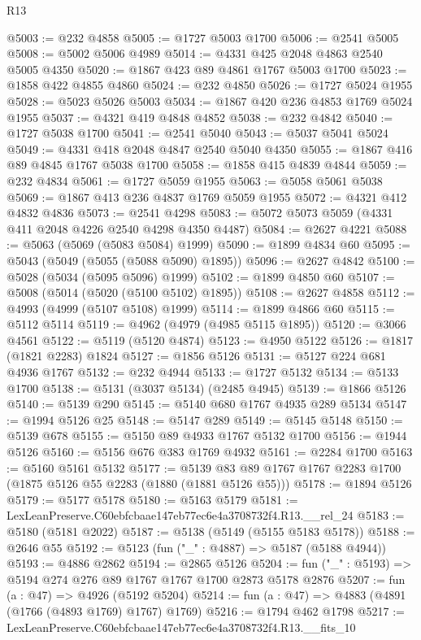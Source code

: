 \begin{lexlean}{R13}
\begin{coremodule}
@5003 := @232 @4858
@5005 := @1727 @5003 @1700
@5006 := @2541 @5005
@5008 := @5002 @5006 @4989
@5014 := @4331 @425 @2048 @4863 @2540 @5005 @4350
@5020 := @1867 @423 @89 @4861 @1767 @5003 @1700
@5023 := @1858 @422 @4855 @4860
@5024 := @232 @4850
@5026 := @1727 @5024 @1955
@5028 := @5023 @5026 @5003
@5034 := @1867 @420 @236 @4853 @1769 @5024 @1955
@5037 := @4321 @419 @4848 @4852
@5038 := @232 @4842
@5040 := @1727 @5038 @1700
@5041 := @2541 @5040
@5043 := @5037 @5041 @5024
@5049 := @4331 @418 @2048 @4847 @2540 @5040 @4350
@5055 := @1867 @416 @89 @4845 @1767 @5038 @1700
@5058 := @1858 @415 @4839 @4844
@5059 := @232 @4834
@5061 := @1727 @5059 @1955
@5063 := @5058 @5061 @5038
@5069 := @1867 @413 @236 @4837 @1769 @5059 @1955
@5072 := @4321 @412 @4832 @4836
@5073 := @2541 @4298
@5083 := @5072 @5073 @5059 (@4331 @411 @2048 @4226 @2540 @4298 @4350 @4487)
@5084 := @2627 @4221
@5088 := @5063 (@5069 (@5083 @5084) @1999)
@5090 := @1899 @4834 @60
@5095 := @5043 (@5049 (@5055 (@5088 @5090) @1895))
@5096 := @2627 @4842
@5100 := @5028 (@5034 (@5095 @5096) @1999)
@5102 := @1899 @4850 @60
@5107 := @5008 (@5014 (@5020 (@5100 @5102) @1895))
@5108 := @2627 @4858
@5112 := @4993 (@4999 (@5107 @5108) @1999)
@5114 := @1899 @4866 @60
@5115 := @5112 @5114
@5119 := @4962 (@4979 (@4985 @5115 @1895))
@5120 := @3066 @4561
@5122 := @5119 (@5120 @4874)
@5123 := @4950 @5122
@5126 := @1817 (@1821 @2283) @1824
@5127 := @1856 @5126
@5131 := @5127 @224 @681 @4936 @1767
@5132 := @232 @4944
@5133 := @1727 @5132
@5134 := @5133 @1700
@5138 := @5131 (@3037 @5134) (@2485 @4945)
@5139 := @1866 @5126
@5140 := @5139 @290
@5145 := @5140 @680 @1767 @4935 @289 @5134
@5147 := @1994 @5126 @25
@5148 := @5147 @289
@5149 := @5145 @5148
@5150 := @5139 @678
@5155 := @5150 @89 @4933 @1767 @5132 @1700
@5156 := @1944 @5126
@5160 := @5156 @676 @383 @1769 @4932
@5161 := @2284 @1700
@5163 := @5160 @5161 @5132
@5177 := @5139 @83 @89 @1767 @1767 @2283 @1700 (@1875 @5126 @55 @2283 (@1880 (@1881 @5126 @55)))
@5178 := @1894 @5126
@5179 := @5177 @5178
@5180 := @5163 @5179
@5181 := LexLeanPreserve.C60ebfcbaae147eb77ec6e4a3708732f4.R13.__rel_24
@5183 := @5180 (@5181 @2022)
@5187 := @5138 (@5149 (@5155 @5183 @5178))
@5188 := @2646 @55
@5192 := @5123 (fun ("_" : @4887) => @5187 (@5188 @4944))
@5193 := @4886 @2862
@5194 := @2865 @5126
@5204 := fun ("_" : @5193) => @5194 @274 @276 @89 @1767 @1767 @1700 @2873 @5178 @2876
@5207 := fun (a : @47) => @4926 (@5192 @5204)
@5214 := fun (a : @47) => @4883 (@4891 (@1766 (@4893 @1769) @1767) @1769)
@5216 := @1794 @462 @1798
@5217 := LexLeanPreserve.C60ebfcbaae147eb77ec6e4a3708732f4.R13.__fits_10

\end{coremodule}
\end{lexlean}
